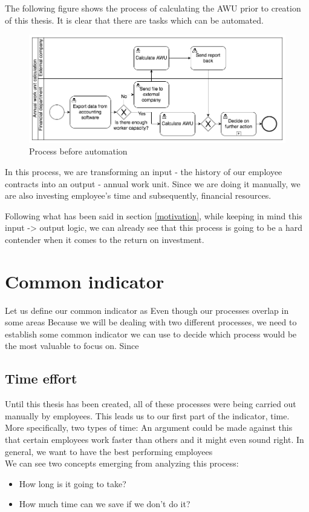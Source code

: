 \documentclass[12pt,oneside]{fithesis2}
\begin{document}
The following figure shows the process of calculating the AWU prior to creation of this thesis. It is clear that there are tasks which can be automated.
\begin{figure}[htp]
    \centering
    \includegraphics[width=\textwidth]{before_automation.png}
    \caption{Process before automation}
    \label{fig:before_automation}
\end{figure}

In this process, we are transforming an input - the history of our employee contracts into an output - annual work unit. Since we are doing it manually, we are also investing employee's time and subsequently, financial resources. 

Following what has been said in section \ref{motivation}, while keeping in mind this input -> output logic, we can already see that this process is going to be a hard contender when it comes to the return on investment.



\section{Common indicator}
Let us define our common indicator as 
Even though our processes overlap in some areas
Because we will be dealing with two different processes, we need to establish some common indicator we can use to decide which process would be the most valuable to focus on. Since

\subsection{Time effort}
Until this thesis has been created, all of these processes were being carried out manually by employees. This leads us to our first part of the indicator, time.
More specifically, two types of time:
An argument could be made against this that certain employees work faster than others and it might even sound right. In general, we want to have the best performing employees
~\\\newline
We can see two concepts emerging from analyzing this process:
\begin{itemize}
    \setlength\itemsep{0em}
    \item How long is it going to take?
    \item How much time can we save if we don't do it?
\end{itemize}
\end{document}
